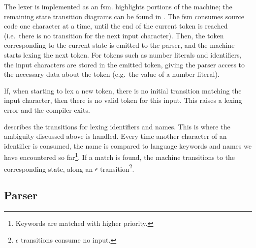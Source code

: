 \documentclass[00-main.tex]{subfiles}
\begin{document}
The lexer is implemented as an \gls{fsm}.  highlights portions of the machine; the remaining state transition diagrams can be found in .
The \gls{fsm} consumes source code one character at a time, until the end of the current token is reached (i.e.\ there is no transition for the next input character).
Then, the token corresponding to the current state is emitted to the parser, and the machine starts lexing the next token.
For tokens such as number literals and identifiers, the input characters are stored in the emitted token, giving the parser access to the necessary data about the token (e.g.~the value of a number literal).

If, when starting to lex a new token, there is no initial transition matching the input character, then there is no valid token for this input. This raises a lexing error and the compiler exits.


 describes the transitions for lexing identifiers and  names.
This is where the ambiguity discussed above is handled.
  Every time another character of an identifier is consumed, the name is compared to language keywords and  names we have encountered so far\footnote{Keywords are matched with higher priority.}.
  If a match is found, the machine transitions to the corresponding state, along an $\epsilon$ transition\footnote{$\epsilon$ transitions consume no input.}.


\subsection{Parser}
\end{document}
